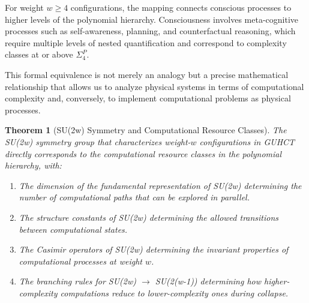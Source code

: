 \documentclass[11pt,a4paper]{article}
\makeatletter
\newtheorem{theorem}{Theorem}[section]
\renewenvironment{proof}[1][\proofname]{\par
  \pushQED{\qed}%
  \normalfont \topsep6\p@\@plus6\p@\relax
  \trivlist
  \item[\hskip\labelsep
        \itshape
    #1\@addpunct{.}]\ignorespaces
}{%
  \popQED\endtrivlist\@endpefalse
}
\makeatother
\begin{document}
\begin{proof}
For weight $w \geq 4$ configurations, the mapping connects conscious processes to higher levels of the polynomial hierarchy. Consciousness involves meta-cognitive processes such as self-awareness, planning, and counterfactual reasoning, which require multiple levels of nested quantification and correspond to complexity classes at or above $\Sigma_4^P$.

This formal equivalence is not merely an analogy but a precise mathematical relationship that allows us to analyze physical systems in terms of computational complexity and, conversely, to implement computational problems as physical processes.
\end{proof}

\begin{theorem}[SU(2w) Symmetry and Computational Resource Classes]
\label{thm:su2w_complexity}
The SU(2w) symmetry group that characterizes weight-$w$ configurations in GUHCT directly corresponds to the computational resource classes in the polynomial hierarchy, with:
\begin{enumerate}
    \item The dimension of the fundamental representation of SU(2w) determining the number of computational paths that can be explored in parallel.
    \item The structure constants of SU(2w) determining the allowed transitions between computational states.
    \item The Casimir operators of SU(2w) determining the invariant properties of computational processes at weight $w$.
    \item The branching rules for SU(2w) $\rightarrow$ SU(2(w-1)) determining how higher-complexity computations reduce to lower-complexity ones during collapse.
\end{enumerate}
\end{theorem}
\end{document}
